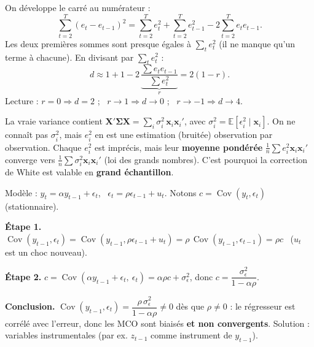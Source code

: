\documentclass[12pt,a4paper]{article}
\newcommand{\vX}{\mathbf{X}}\newcommand{\vy}{\mathbf{y}}\newcommand{\vb}{\mathbf{b}}\newcommand{\ve}{\mathbf{e}}
\newcommand{\E}{\mathbb{E}}\newcommand{\Var}{\operatorname{Var}}\newcommand{\Cov}{\operatorname{Cov}}
\begin{document}
\begin{dev}[title={(b) Pourquoi $d\approx2(1-r)$ (Durbin-Watson)}]
On développe le carré au numérateur :
\[
\sum_{t=2}^{T}(e_t-e_{t-1})^2=\sum_{t=2}^{T}e_t^2+\sum_{t=2}^{T}e_{t-1}^2-2\sum_{t=2}^{T}e_te_{t-1}.
\]
Les deux premières sommes sont presque égales à $\sum_te_t^2$ (il ne manque qu'un terme à chacune). En divisant par $\sum_te_t^2$ :
\[
d\approx1+1-2\,\underbrace{\frac{\sum e_te_{t-1}}{\sum e_t^2}}_{r}=2(1-r).
\]
Lecture : $r=0\Rightarrow d=2$ ; \ $r\to1\Rightarrow d\to0$ ; \ $r\to-1\Rightarrow d\to4$.
\end{dev}

\begin{dev}[title={(c) Pourquoi $e_i^2$ marche dans la formule de White}]
La vraie variance contient $\vX'\bm\Sigma\vX=\sum_i\sigma_i^2\,\mathbf x_i\mathbf x_i'$, avec $\sigma_i^2=\E[\epsilon_i^2\mid\mathbf x_i]$.
On ne connaît pas $\sigma_i^2$, mais $e_i^2$ en est une estimation (bruitée) observation par observation. Chaque $e_i^2$ est imprécis, mais leur \textbf{moyenne pondérée} $\frac1n\sum e_i^2\mathbf x_i\mathbf x_i'$ converge vers $\frac1n\sum\sigma_i^2\mathbf x_i\mathbf x_i'$ (loi des grands nombres). C'est pourquoi la correction de White est valable en \textbf{grand échantillon}.
\end{dev}

\begin{dev}[title={(d) $y_{t-1}$ régresseur + erreurs AR(1) : MCO non convergents}]
Modèle : $y_t=\alpha y_{t-1}+\epsilon_t$, \ $\epsilon_t=\rho\epsilon_{t-1}+u_t$. Notons $c=\Cov(y_t,\epsilon_t)$ (stationnaire).

\textbf{Étape 1.} $\Cov(y_{t-1},\epsilon_t)=\Cov(y_{t-1},\rho\epsilon_{t-1}+u_t)=\rho\,\Cov(y_{t-1},\epsilon_{t-1})=\rho c$ \ ($u_t$ est un choc nouveau).

\textbf{Étape 2.} $c=\Cov(\alpha y_{t-1}+\epsilon_t,\ \epsilon_t)=\alpha\rho c+\sigma_\epsilon^2$, donc $c=\dfrac{\sigma_\epsilon^2}{1-\alpha\rho}$.

\textbf{Conclusion.} $\Cov(y_{t-1},\epsilon_t)=\dfrac{\rho\,\sigma_\epsilon^2}{1-\alpha\rho}\neq0$ dès que $\rho\neq0$ : le régresseur est corrélé avec l'erreur, donc les MCO sont biaisés \textbf{et non convergents}. Solution : variables instrumentales (par ex. $z_{t-1}$ comme instrument de $y_{t-1}$).
\end{dev}
\end{document}
